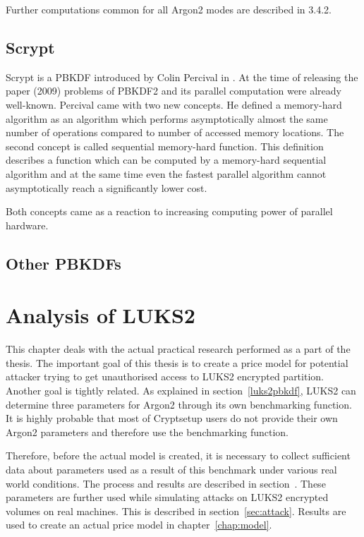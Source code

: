 \documentclass[nolof]{fithesis3}
\begin{document}
Further computations common for all Argon2 modes are described in \parencite{argon2draft}{3.4.2}.

\section{Scrypt}
Scrypt is a PBKDF introduced by Colin Percival in \parencite{memoryhard}. At the time of releasing the paper (2009) problems of PBKDF2 and its parallel computation were already well-known. Percival came with two new concepts. He defined a memory-hard algorithm as an algorithm which performs asymptotically almost the same number of operations compared to number of accessed memory locations. The second concept is called sequential memory-hard function. This definition describes a function which can be computed by a memory-hard sequential algorithm and at the same time even the fastest parallel algorithm cannot asymptotically reach a significantly lower cost.

Both concepts came as a reaction to increasing computing power of parallel hardware. 

\section{Other PBKDFs}

\chapter{Analysis of LUKS2}
This chapter deals with the actual practical research performed as a part of the thesis. The important goal of this thesis is to create a price model for potential attacker trying to get unauthorised access to LUKS2 encrypted partition. Another goal is tightly related. As explained in section~\ref{luks2pbkdf}, LUKS2 can determine three parameters for Argon2 through its own benchmarking function. It is highly probable that most of Cryptsetup users do not provide their own Argon2 parameters and therefore use the benchmarking function.

Therefore, before the actual model is created, it is necessary to collect sufficient data about parameters used as a result of  this benchmark under various real world conditions. The process and results are described in section~\parencite{sec:benchmark}. These parameters are further used while simulating attacks on LUKS2 encrypted volumes on real machines.  This is described in section~\ref{sec:attack}. Results are used to create an actual price model in chapter~\ref{chap:model}.
\end{document}
